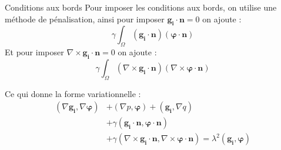 \documentclass{beamer}
\newcommand{\grad}{{\nabla}}
\newcommand{\rot}{{\nabla\times}}
\begin{document}
\begin{frame}{Conditions aux bords}
Pour imposer les conditions aux bords, on utilise une méthode de pénalisation, ainsi pour imposer $\bm{g_i}\cdot\bm{n}=0$ on ajoute :
\[
\gamma\int_\Omega (\bm{g_i}\cdot\bm{n})(\bm{\varphi}\cdot\bm{n})
\]
Et pour imposer $\rot\bm{g_i}\cdot\bm{n}=0$ on ajoute :
\[
\gamma\int_\Omega (\rot\bm{g_i}\cdot\bm{n})(\rot\bm{\varphi}\cdot\bm{n})
\]
\begin{block}{Ce qui donne la forme variationnelle :}
\[\begin{aligned}
(\grad\bm{g_i},\grad\bm{\varphi}) &+ (\grad p, \bm{\varphi}) + (\bm{g_i}, \grad q)\\
&+ \gamma(\bm{g_i}\cdot\bm{n},\bm{\varphi}\cdot\bm{n})\\ &+ \gamma(\rot\bm{g_i}\cdot\bm{n},\rot\bm{\varphi}\cdot\bm{n}) = \lambda^2(\bm{g_i},\bm{\varphi})
\end{aligned}\]
\end{block}
\end{frame}
\end{document}
